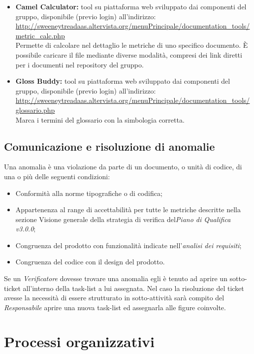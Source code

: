 \documentclass[a4paper]{article}
\begin{document}
\begin{itemize}
				\item \textbf{Camel Calculator:} tool su piattaforma web sviluppato dai componenti del gruppo,
				disponibile (previo login) all'indirizzo: \\
				\url{http://sweeneytreadaas.altervista.org/menuPrincipale/documentation_tools/metric_calc.php} \\
				Permette di calcolare nel dettaglio le metriche di uno specifico documento. È possibile caricare
				il file mediante diverse modalità, compresi dei link diretti per i documenti nel repository del gruppo.
				
				\item \textbf{Gloss Buddy:} tool su piattaforma web sviluppato dai componenti del gruppo,
				disponibile (previo login) all'indirizzo: \\
				\url{http://sweeneytreadaas.altervista.org/menuPrincipale/documentation_tools/glossario.php} \\
				Marca i termini del glossario con la simbologia corretta.
				
			\end{itemize}
			
			\subsection{Comunicazione e risoluzione di anomalie}
			Una anomalia è una violazione da parte di un documento, o unità di codice, di una o più delle seguenti condizioni:
			\begin{itemize}
				\item Conformità alla norme tipografiche o di codifica;
				\item Appartenenza al range di accettabilità per tutte le metriche descritte nella sezione Visione generale della strategia di verifica del\emph{Piano di Qualifica v3.0.0};
				\item Congruenza del prodotto con funzionalità indicate nell'\emph{analisi dei requisiti};
				\item Congruenza del codice con il design del prodotto.
			\end{itemize}
			Se un \emph{Verificatore} dovesse trovare una anomalia egli è tenuto ad aprire un sotto-ticket all'interno 
			della task-list a lui assegnata. Nel caso la risoluzione del ticket avesse la necessità di essere strutturato 
			in sotto-attività sarà compito del \emph{Responsabile} aprire una nuova task-list ed assegnarla alle figure coinvolte.
			

	\newpage
	\section{Processi organizzativi}
\end{document}

